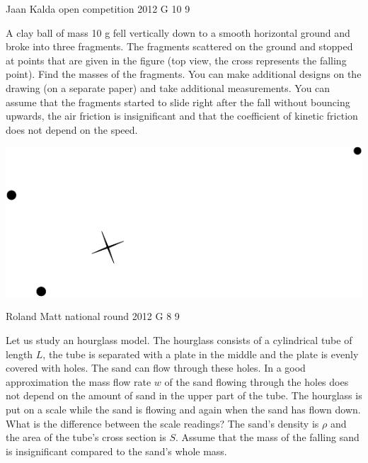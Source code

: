 \documentclass[11pt]{article}
\begin{document}
{Jaan Kalda} %
{open competition} %
{2012} %
{G 10} %
{9} %
{

\ifEngStatement
A clay ball of mass 10 g fell vertically down to a smooth horizontal ground and broke into three fragments. The fragments scattered on the ground and stopped at points that are given in the figure (top view, the cross represents the falling point). Find the masses of the fragments. You can make additional designs on the drawing (on a separate paper) and take additional measurements. You can assume that the fragments started to slide right after the fall without bouncing upwards, the air friction is insignificant and that the coefficient of kinetic friction does not depend on the speed. 
\begin{center}
\includegraphics[width=0.8\linewidth]{2012-lahg-10-killud}
\end{center}
\fi
}

{Roland Matt} %
{national round} %
{2012} %
{G 8} %
{9} %
{

\ifEngStatement
Let us study an hourglass model. The hourglass consists of a cylindrical tube of length $L$, the tube is separated with a plate in the middle and the plate is evenly covered with holes. The sand can flow through these holes. In a good approximation the mass flow rate $w$ of the sand flowing through the holes does not depend on the amount of sand in the upper part of the tube. The hourglass is put on a scale while the sand is flowing and again when the sand has flown down. What is the difference between the scale readings? The sand’s density is $\rho$ and the area of the tube’s cross section is $S$. Assume that the mass of the falling sand is insignificant compared to the sand’s whole mass.
\fi
}
\end{document}
